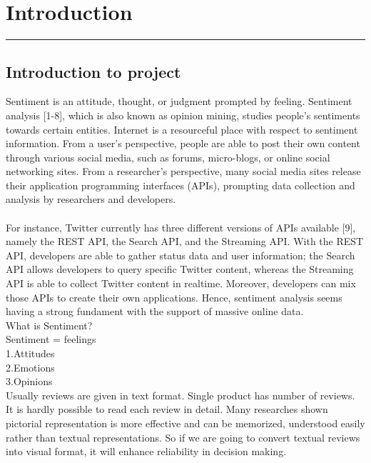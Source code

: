


\chapter{Introduction}\hrule
\label{Chapter:1}
\section{Introduction to project}

Sentiment is an attitude, thought, or judgment prompted by feeling. Sentiment analysis [1-8], which is also known as opinion mining, studies people’s sentiments towards certain entities. Internet is a resourceful place with respect to sentiment information. From a user’s perspective, people are able to post their own content through various social media, such as forums, micro-blogs, or online social networking sites. From a researcher’s perspective, many social media sites release their application programming interfaces (APIs), prompting data collection and analysis by researchers and developers.\\
\\
 For instance, Twitter currently has three different versions of APIs available [9], namely the REST API, the Search API, and the Streaming API. With the REST API, developers are able to gather status data and user information; the Search API allows developers to query specific Twitter content, whereas the Streaming API is able to collect Twitter content in realtime. Moreover, developers can mix those APIs to create their own applications. Hence, sentiment analysis seems having a strong fundament with the support of massive online data.\\
What is Sentiment?\\ 
Sentiment = feelings\\
1.Attitudes\\
2.Emotions\\
3.Opinions\\

Usually reviews are given in text format. Single product has number of reviews. It is hardly
possible to read each review in detail. Many researches shown pictorial representation is more
effective and can be memorized, understood easily rather than textual representations. So if we
are going to convert textual reviews into visual format, it will enhance reliability in decision making.

